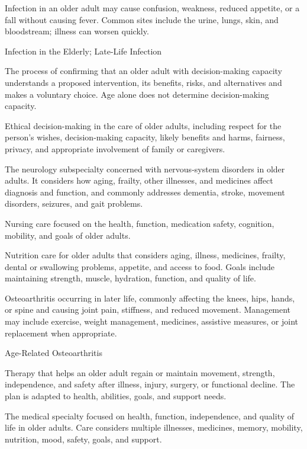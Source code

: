  Infection in an older adult may cause confusion, weakness, reduced appetite, or a fall without causing fever. Common sites include the urine, lungs, skin, and bloodstream; illness can worsen quickly.

\synonyms
Infection in the Elderly; Late-Life Infection

 The process of confirming that an older adult with decision-making capacity understands a proposed intervention, its benefits, risks, and alternatives and makes a voluntary choice. Age alone does not determine decision-making capacity.

 Ethical decision-making in the care of older adults, including respect for the person’s wishes, decision-making capacity, likely benefits and harms, fairness, privacy, and appropriate involvement of family or caregivers.

 The neurology subspecialty concerned with nervous-system disorders in older
adults. It considers how aging, frailty, other illnesses, and medicines affect diagnosis
and function, and commonly addresses dementia, stroke, movement disorders, seizures,
and gait problems.

 Nursing care focused on the health, function, medication safety, cognition, mobility, and goals of older adults.

 Nutrition care for older adults that considers aging, illness, medicines, frailty, dental or swallowing problems, appetite, and access to food. Goals include maintaining strength, muscle, hydration, function, and quality of life.

 Osteoarthritis occurring in later life, commonly affecting the knees, hips, hands, or spine
and causing joint pain, stiffness, and reduced movement. Management may include exercise,
weight management, medicines, assistive measures, or joint replacement when appropriate.

\synonyms
Age-Related Osteoarthritis

 Therapy that helps an older adult regain or maintain movement, strength, independence, and safety after illness, injury, surgery, or functional decline. The plan is adapted to health, abilities, goals, and support needs.

 The medical specialty focused on health, function, independence, and quality of life in older adults. Care considers multiple illnesses, medicines, memory, mobility, nutrition, mood, safety, goals, and support.

